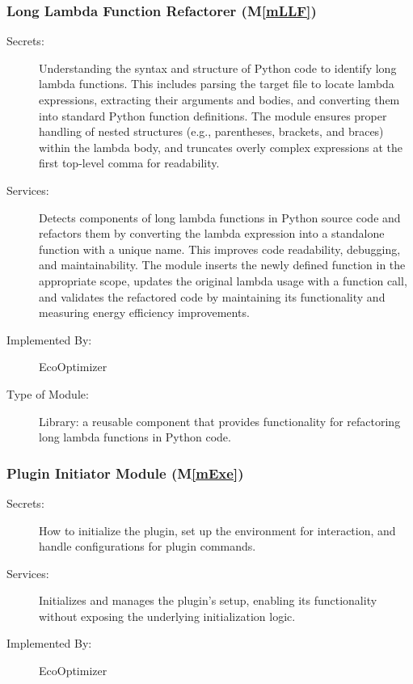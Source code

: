 \documentclass[12pt, titlepage]{article}
\newcommand{\mref}[1]{M\ref{#1}}
\begin{document}
\subsubsection{Long Lambda Function Refactorer (\mref{mLLF})}


\begin{description} 
  \item[Secrets:] Understanding the syntax and structure of Python code to identify long lambda functions. This includes parsing the target file to locate lambda expressions, extracting their arguments and bodies, and converting them into standard Python function definitions. The module ensures proper handling of nested structures (e.g., parentheses, brackets, and braces) within the lambda body, and truncates overly complex expressions at the first top-level comma for readability.

  \item[Services:] Detects components of long lambda functions in Python source code and refactors them by converting the lambda expression into a standalone function with a unique name. This improves code readability, debugging, and maintainability. The module inserts the newly defined function in the appropriate scope, updates the original lambda usage with a function call, and validates the refactored code by maintaining its functionality and measuring energy efficiency improvements.

  \item[Implemented By:] EcoOptimizer
  
  \item[Type of Module:] Library: a reusable component that provides functionality for refactoring long lambda functions in Python code.
\end{description}

\subsubsection{Plugin Initiator Module (\mref{mExe})}


\begin{description}
    \item[Secrets:] How to initialize the plugin, set up the environment for interaction, and handle configurations for plugin commands.
    \item[Services:] Initializes and manages the plugin's setup, enabling its functionality without exposing the underlying initialization logic.
    \item[Implemented By:] EcoOptimizer
\end{description}
\end{document}
